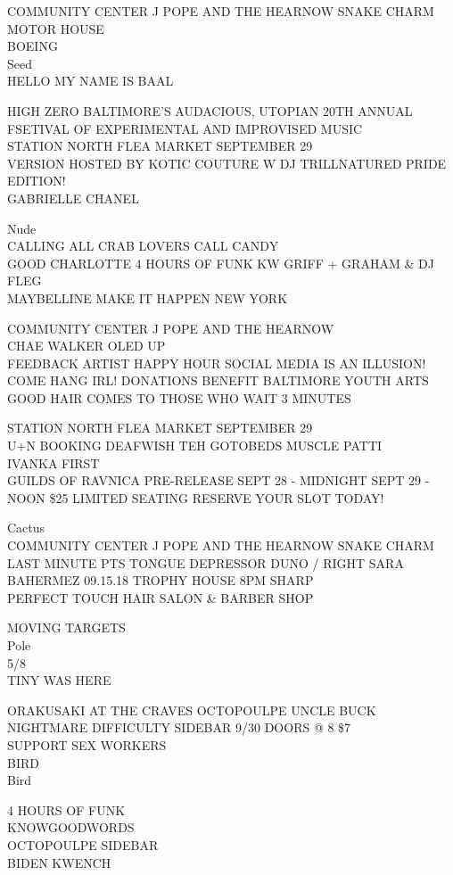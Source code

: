 \documentclass[10pt,letterpaper]{article}
\begin{document}
COMMUNITY CENTER J POPE AND THE HEARNOW SNAKE CHARM MOTOR HOUSE\\
BOEING\\
Seed\\
HELLO MY NAME IS BAAL

HIGH ZERO BALTIMORE'S AUDACIOUS, UTOPIAN 20TH ANNUAL FSETIVAL OF EXPERIMENTAL AND IMPROVISED MUSIC\\
STATION NORTH FLEA MARKET SEPTEMBER 29\\
VERSION HOSTED BY KOTIC COUTURE W DJ TRILLNATURED PRIDE EDITION!\\
GABRIELLE CHANEL

Nude\\
CALLING ALL CRAB LOVERS CALL CANDY\\
GOOD CHARLOTTE 4 HOURS OF FUNK KW GRIFF + GRAHAM \& DJ FLEG\\
MAYBELLINE MAKE IT HAPPEN NEW YORK

COMMUNITY CENTER J POPE AND THE HEARNOW\\
CHAE WALKER OLED UP\\
FEEDBACK ARTIST HAPPY HOUR SOCIAL MEDIA IS AN ILLUSION!  COME HANG IRL!  DONATIONS BENEFIT BALTIMORE YOUTH ARTS\\
GOOD HAIR COMES TO THOSE WHO WAIT 3 MINUTES

STATION NORTH FLEA MARKET SEPTEMBER 29\\
U+N BOOKING DEAFWISH TEH GOTOBEDS MUSCLE PATTI\\
IVANKA FIRST\\
GUILDS OF RAVNICA PRE{-}RELEASE SEPT 28 {-} MIDNIGHT SEPT 29 {-} NOON \$25 LIMITED SEATING RESERVE YOUR SLOT TODAY!

Cactus\\
COMMUNITY CENTER J POPE AND THE HEARNOW SNAKE CHARM\\
LAST MINUTE PTS TONGUE DEPRESSOR DUNO / RIGHT SARA BAHERMEZ 09.15.18 TROPHY HOUSE 8PM SHARP\\
PERFECT TOUCH HAIR SALON \& BARBER SHOP

MOVING TARGETS\\
Pole\\
5/8\\
TINY WAS HERE

ORAKUSAKI AT THE CRAVES OCTOPOULPE UNCLE BUCK NIGHTMARE DIFFICULTY SIDEBAR 9/30 DOORS @ 8 \$7\\
SUPPORT SEX WORKERS\\
BIRD\\
Bird

4 HOURS OF FUNK\\
KNOWGOODWORDS\\
OCTOPOULPE SIDEBAR\\
BIDEN KWENCH
\end{document}
